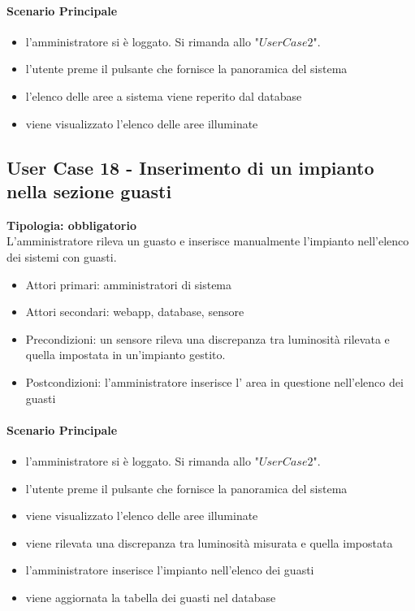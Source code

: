 \documentclass[12pt]{article}
\begin{document}
\paragraph{Scenario Principale}
\begin{itemize}
	\item l'amministratore si è loggato. Si rimanda allo "$User Case 2$".
	\item l'utente preme il pulsante che fornisce la panoramica del sistema
	\item l'elenco delle aree a sistema viene reperito dal database
	\item viene visualizzato l'elenco delle aree illuminate
\end{itemize}

\subsection{User Case 18 - Inserimento di un impianto nella sezione guasti}
\textbf{Tipologia: obbligatorio} \\
L'amministratore rileva un guasto e inserisce manualmente l'impianto nell'elenco dei sistemi con guasti.
\begin{itemize}
	\item Attori primari: amministratori di sistema
	\item Attori secondari: webapp, database, sensore
	\item Precondizioni: un sensore rileva una discrepanza tra luminosità rilevata e quella impostata in un'impianto gestito.
	\item Postcondizioni: l'amministratore inserisce l' area in questione nell'elenco dei guasti
\end{itemize}
\paragraph{Scenario Principale}
\begin{itemize}
	\item l'amministratore si è loggato. Si rimanda allo "$User Case 2$".
	\item l'utente preme il pulsante che fornisce la panoramica del sistema
	\item viene visualizzato l'elenco delle aree illuminate
	\item viene rilevata una discrepanza tra luminosità misurata e quella impostata
	\item l'amministratore inserisce l'impianto nell'elenco dei guasti
	\item viene aggiornata la tabella dei guasti nel database
\end{itemize}
\end{document}
